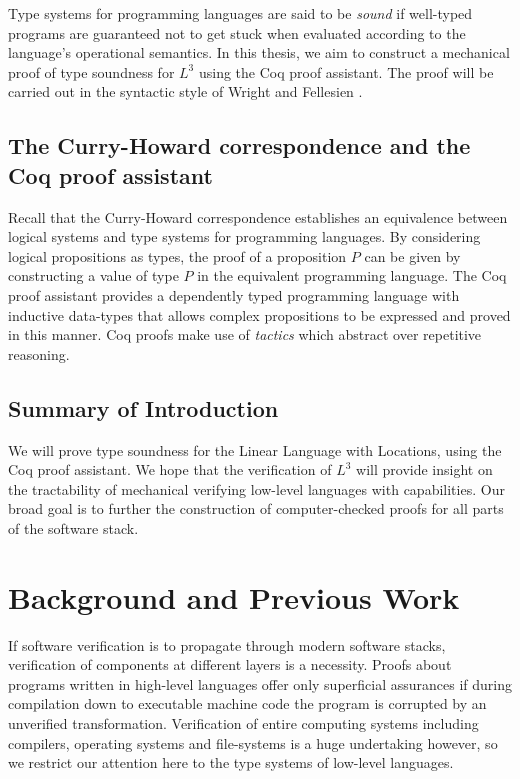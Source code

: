 \documentclass[]{unswthesis}
\begin{document}
Type systems for programming languages are said to be \textit{sound} if well-typed programs are guaranteed not to get stuck when evaluated according to the language's operational semantics. In this thesis, we aim to construct a mechanical proof of type soundness for $L^3$ using the Coq proof assistant. The proof will be carried out in the syntactic style of Wright and Fellesien \cite{wright94}.

\section{The Curry-Howard correspondence and the Coq proof assistant}
\label{sec:curry_howard}

Recall that the Curry-Howard correspondence establishes an equivalence between logical systems and type systems for programming languages. By considering logical propositions as types, the proof of a proposition $P$ can be given by constructing a value of type $P$ in the equivalent programming language. The Coq proof assistant provides a dependently typed programming language with inductive data-types that allows complex propositions to be expressed and proved in this manner. Coq proofs make use of \textit{tactics} which abstract over repetitive reasoning.

\section{Summary of Introduction}

We will prove type soundness for the Linear Language with Locations, using the Coq proof assistant. We hope that the verification of $L^3$ will provide insight on the tractability of mechanical verifying low-level languages with capabilities. Our broad goal is to further the construction of computer-checked proofs for all parts of the software stack.

\chapter{Background and Previous Work}
\label{ch:background}

If software verification is to propagate through modern software stacks, verification of components at different layers is a necessity. Proofs about programs written in high-level languages offer only superficial assurances if during compilation down to executable machine code the program is corrupted by an unverified transformation. Verification of entire computing systems including compilers, operating systems and file-systems is a huge undertaking however, so we restrict our attention here to the type systems of low-level languages.
\end{document}
